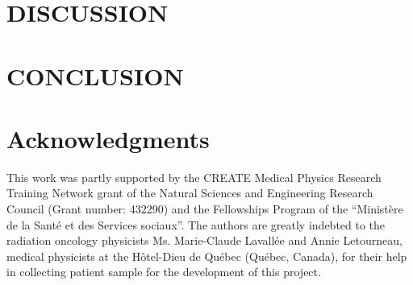 \section{DISCUSSION}
%
\section{CONCLUSION}
%
\section{Acknowledgments}
This work was partly supported by the CREATE Medical Physics Research Training Network grant of the Natural Sciences and Engineering Research Council (Grant number: 432290) and the Fellowships Program of the \enquote{Ministère de la Santé et des Services sociaux}. The authors are greatly indebted to the radiation oncology physicists Ms. Marie-Claude Lavallée and Annie Letourneau, medical physicists at the Hôtel-Dieu de Québec (Québec, Canada), for their help in  collecting patient sample for the development of this project. 

